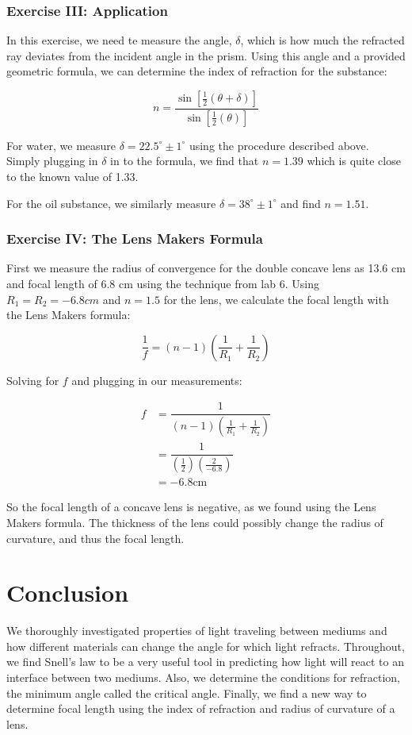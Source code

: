 \documentclass[12pt]{article}
\begin{document}
\subsubsection*{Exercise III: Application}
In this exercise, we need te measure the angle, $\delta$, which is how
much the refracted ray deviates from the incident angle in the
prism. Using this angle and a provided geometric formula, we can
determine the index of refraction for the substance:

\begin{center}
  \begin{equation*}
    n = \dfrac{\sin\left[\frac{1}{2}(\theta + \delta)\right]}{\sin\left[\frac{1}{2}(\theta)\right]}
  \end{equation*}
\end{center}

For water, we measure $\delta = 22.5^{\circ} \pm 1^{\circ}$ using the
procedure described above. Simply plugging in $\delta$ in to the
formula, we find that $n = 1.39$ which is quite close to the known
value of 1.33.

For the oil substance, we similarly measure $\delta = 38^{\circ} \pm
1^{\circ}$ and find $n = 1.51$.

\subsubsection*{Exercise IV: The Lens Makers Formula}
First we measure the radius of convergence for the double concave lens
as 13.6 cm and focal length of 6.8 cm using the technique from lab
6. Using $R_1 = R_2 = -6.8cm$ and $n = 1.5$ for the lens, we calculate
the focal length with the Lens Makers formula:

\[ \frac{1}{f} = (n-1)\left(\frac{1}{R_1}+\frac{1}{R_2}\right) \]

\noindent Solving for $f$ and plugging in our measurements:

\begin{align*}
  f &= \dfrac{1}{(n-1)\left(\frac{1}{R_1} + \frac{1}{R_2}\right)}\\
  &= \dfrac{1}{(\frac{1}{2})\left(\frac{2}{-6.8}\right)} \\
  &= -6.8 \mathrm{cm}
\end{align*}

So the focal length of a concave lens is negative, as we found using
the Lens Makers formula. The thickness of the lens could possibly
change the radius of curvature, and thus the focal length.

\section*{Conclusion}
We thoroughly investigated properties of light traveling between
mediums and how different materials can change the angle for which
light refracts. Throughout, we find Snell's law to be a very useful
tool in predicting how light will react to an interface between two
mediums. Also, we determine the conditions for refraction, the minimum
angle called the critical angle. Finally, we find a new way to
determine focal length using the index of refraction and radius of
curvature of a lens.
\end{document}
